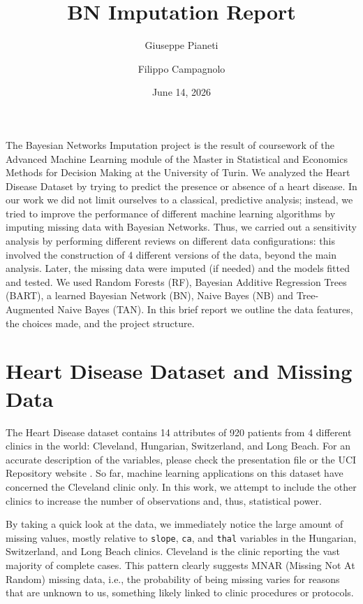 \documentclass[11pt, a4paper]{article}
\title{BN Imputation Report}
\author{Giuseppe Pianeti \and Filippo Campagnolo}
\date{June 14, 2026}
\begin{document}
	
	\maketitle
	
	The Bayesian Networks Imputation project is the result of coursework of the Advanced Machine Learning module of the Master in Statistical and Economics Methods for Decision Making at the University of Turin. We analyzed the Heart Disease Dataset \cite{uci1988heart} by trying to predict the presence or absence of a heart disease. In our work we did not limit ourselves to a classical, predictive analysis; instead, we tried to improve the performance of different machine learning algorithms by imputing missing data with Bayesian Networks. Thus, we carried out a sensitivity analysis by performing different reviews on different data configurations: this involved the construction of 4 different versions of the data, beyond the main analysis. Later, the missing data were imputed (if needed) and the models fitted and tested. We used Random Forests (RF), Bayesian Additive Regression Trees (BART), a learned Bayesian Network (BN), Naive Bayes (NB) and Tree-Augmented Naive Bayes (TAN). In this brief report we outline the data features, the choices made, and the project structure.
	
	\section{Heart Disease Dataset and Missing Data}
	The Heart Disease dataset contains 14 attributes of 920 patients from 4 different clinics in the world: Cleveland, Hungarian, Switzerland, and Long Beach. For an accurate description of the variables, please check the presentation file or the UCI Repository website \cite{uci1988heart}. So far, machine learning applications on this dataset have concerned the Cleveland clinic only. In this work, we attempt to include the other clinics to increase the number of observations and, thus, statistical power.
	
	By taking a quick look at the data, we immediately notice the large amount of missing values, mostly relative to \texttt{slope}, \texttt{ca}, and \texttt{thal} variables in the Hungarian, Switzerland, and Long Beach clinics. Cleveland is the clinic reporting the vast majority of complete cases. This pattern clearly suggests MNAR (Missing Not At Random) missing data, i.e., the probability of being missing varies for reasons that are unknown to us, something likely linked to clinic procedures or protocols.
	
\end{document}
